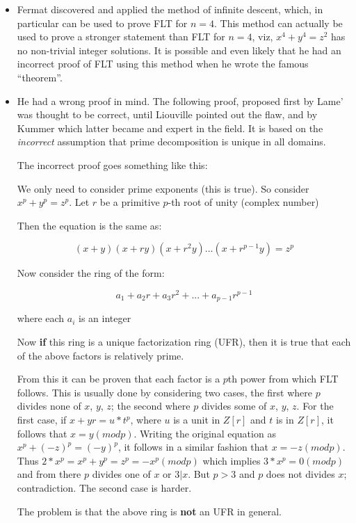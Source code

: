 \begin{itemize}
  \item Fermat discovered and applied the method of infinite descent,
  which, in particular can be used to prove FLT for $n=4$.  This method
  can actually be used to prove a stronger statement than FLT for $n=4$,
  viz, $x^4 + y^4 = z^2$ has no non-trivial integer solutions.  It is
  possible and even likely that he had an incorrect proof of FLT using
  this method when he wrote the famous ``theorem''.
  \item He had a wrong proof in mind. The following proof, proposed
  first by Lame' was thought to be correct, until Liouville pointed out
  the flaw, and by Kummer which latter became and expert in the field.
  It is based on the {\em incorrect} assumption that prime decomposition
  is unique in all domains.

  The incorrect proof goes something like this:

  We only need to consider prime exponents (this is true).  So consider
  $x^p + y^p = z^p$.  Let $r$ be a primitive $p$-th root of unity
  (complex number)

  Then the equation is the same as:

  \[(x+y)(x+ry)(x+r^2y)...(x+r^{p-1}y) = z^p\]

  Now consider the ring of the form:

  \[a_1 + a_2 r + a_3 r^2 + ... + a_{p-1} r^{p-1}\]

  where each $a_i$ is an integer

  Now {\bf if} this ring is a unique factorization ring (UFR), then it
  is true that each of the above factors is relatively prime.

  From this it can be proven that each factor is a $p$th power from
  which FLT follows.  This is usually done by considering two cases, the
  first where $p$ divides none of $x$, $y$, $z$; the second where $p$
  divides some of $x$, $y$, $z$.  For the first case, if $x+yr=u*t^p$,
  where $u$ is a unit in $Z[r]$ and $t$ is in $Z[r]$, it follows that
  $x=y (mod p)$. Writing the original equation as $x^p + (-z)^p =
  (-y)^p$, it follows in a similar fashion that $x = -z (mod p)$.  Thus
  $2*x^p = x^p + y^p = z^p = -x^p (mod p)$ which implies $3*x^p = 0 (mod
  p)$ and from there $p$ divides one of $x$ or $3|x$. But $p>3$ and $p$
  does not divides $x$; contradiction.  The second case is harder.


  The problem is that the above ring is {\bf not} an UFR in general.

\end{itemize}

